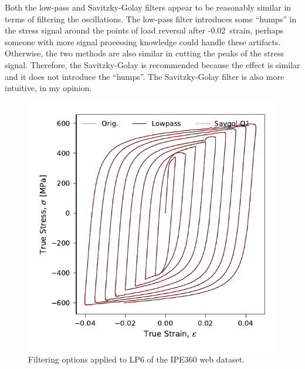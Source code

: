\documentclass[a4paper,11pt]{article}
\begin{document}
Both the low-pass and Savitzky-Golay filters appear to be reasonably similar in terms of filtering the oscillations.
The low-pass filter introduces some ``humps'' in the stress signal around the points of load reversal after -0.02~strain, perhaps someone with more signal processing knowledge could handle these artifacts.
Otherwise, the two methods are also similar in cutting the peaks of the stress signal.
Therefore, the Savitzky-Golay is recommended because the effect is similar and it does not introduce the ``humps''.
The Savitzky-Golay filter is also more intuitive, in my opinion.


\begin{figure}
    \centering
    \includegraphics{test_lowpass.pdf}
    \caption{Filtering options applied to LP6 of the IPE360 web dataset.}
    \label{fig:filtering-options}
\end{figure}
\end{document}
